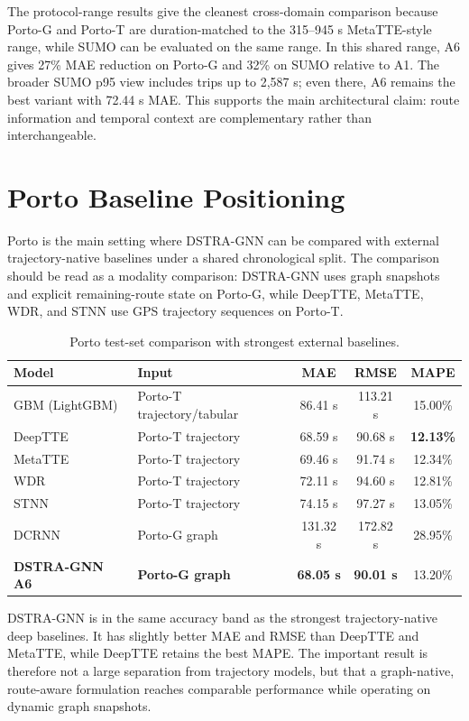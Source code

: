 \documentclass[10pt,a4paper]{article}
\begin{document}
The protocol-range results give the cleanest cross-domain comparison because Porto-G and Porto-T are duration-matched to the 315--945 s MetaTTE-style range, while SUMO can be evaluated on the same range. In this shared range, A6 gives 27\% MAE reduction on Porto-G and 32\% on SUMO relative to A1. The broader SUMO p95 view includes trips up to 2,587 s; even there, A6 remains the best variant with 72.44 s MAE. This supports the main architectural claim: route information and temporal context are complementary rather than interchangeable.

\section{Porto Baseline Positioning}

Porto is the main setting where DSTRA-GNN can be compared with external trajectory-native baselines under a shared chronological split. The comparison should be read as a modality comparison: DSTRA-GNN uses graph snapshots and explicit remaining-route state on Porto-G, while DeepTTE, MetaTTE, WDR, and STNN use GPS trajectory sequences on Porto-T.

\begin{table}[h]
\centering
\caption{Porto test-set comparison with strongest external baselines.}
\small
\begin{tabular}{@{}llccc@{}}
\toprule
\textbf{Model} & \textbf{Input} & \textbf{MAE} & \textbf{RMSE} & \textbf{MAPE} \\
\midrule
GBM (LightGBM) & Porto-T trajectory/tabular & 86.41 s & 113.21 s & 15.00\% \\
DeepTTE & Porto-T trajectory & 68.59 s & 90.68 s & \textbf{12.13\%} \\
MetaTTE & Porto-T trajectory & 69.46 s & 91.74 s & 12.34\% \\
WDR & Porto-T trajectory & 72.11 s & 94.60 s & 12.81\% \\
STNN & Porto-T trajectory & 74.15 s & 97.27 s & 13.05\% \\
DCRNN & Porto-G graph & 131.32 s & 172.82 s & 28.95\% \\
\textbf{DSTRA-GNN A6} & \textbf{Porto-G graph} & \textbf{68.05 s} & \textbf{90.01 s} & 13.20\% \\
\bottomrule
\end{tabular}
\end{table}

DSTRA-GNN is in the same accuracy band as the strongest trajectory-native deep baselines. It has slightly better MAE and RMSE than DeepTTE and MetaTTE, while DeepTTE retains the best MAPE. The important result is therefore not a large separation from trajectory models, but that a graph-native, route-aware formulation reaches comparable performance while operating on dynamic graph snapshots.
\end{document}
